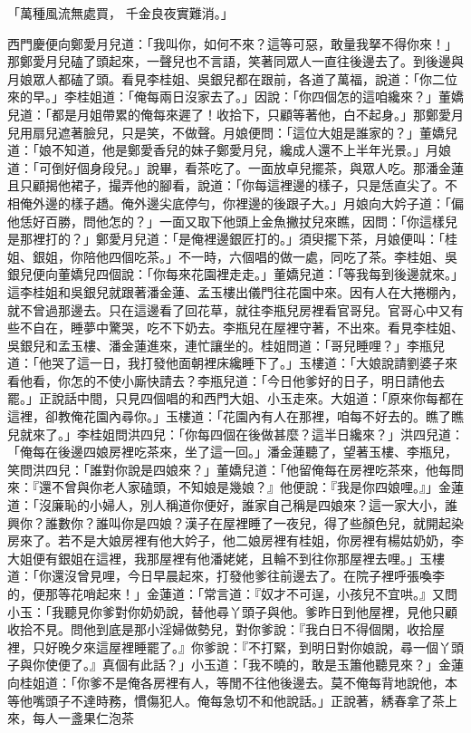 \begin{showcontents}{}
「萬種風流無處買，  千金良夜實難消。」

西門慶便向鄭愛月兒道：「我叫你，如何不來？這等可惡，敢量我拏不得你來！」那鄭愛月兒磕了頭起來，一聲兒也不言語，笑著同眾人一直往後邊去了。到後邊與月娘眾人都磕了頭。看見李桂姐、吳銀兒都在跟前，各道了萬福，說道：「你二位來的早。」李桂姐道：「俺每兩日沒家去了。」因說：「你四個怎的這咱纔來？」董嬌兒道：「都是月姐帶累的俺每來遲了！收拾下，只顧等著他，白不起身。」那鄭愛月兒用扇兒遮著臉兒，只是笑，不做聲。月娘便問：「這位大姐是誰家的？」董嬌兒道：「娘不知道，他是鄭愛香兒的妹子鄭愛月兒，纔成人還不上半年光景。」月娘道：「可倒好個身段兒。」說畢，看茶吃了。一面放卓兒擺茶，與眾人吃。那潘金蓮且只顧揭他裙子，撮弄他的腳看，說道：「你每這裡邊的樣子，只是恁直尖了。不相俺外邊的樣子趫。俺外邊尖底停勻，你裡邊的後跟子大。」月娘向大妗子道：「偏他恁好百勝，問他怎的？」一面又取下他頭上金魚撇扙兒來瞧，因問：「你這樣兒是那裡打的？」鄭愛月兒道：「是俺裡邊銀匠打的。」須臾擺下茶，月娘便叫：「桂姐、銀姐，你陪他四個吃茶。」不一時，六個唱的做一處，同吃了茶。李桂姐、吳銀兒便向董嬌兒四個說：「你每來花園裡走走。」董嬌兒道：「等我每到後邊就來。」這李桂姐和吳銀兒就跟著潘金蓮、孟玉樓出儀門往花園中來。因有人在大捲棚內，就不曾過那邊去。只在這邊看了回花草，就往李瓶兒房裡看官哥兒。官哥心中又有些不自在，睡夢中驚哭，吃不下奶去。李瓶兒在屋裡守著，不出來。看見李桂姐、吳銀兒和孟玉樓、潘金蓮進來，連忙讓坐的。桂姐問道：「哥兒睡哩？」李瓶兒道：「他哭了這一日，我打發他面朝裡床纔睡下了。」玉樓道：「大娘說請劉婆子來看他看，你怎的不使小廝快請去？李瓶兒道：「今日他爹好的日子，明日請他去罷。」正說話中間，只見四個唱的和西門大姐、小玉走來。大姐道：「原來你每都在這裡，卻教俺花園內尋你。」玉樓道：「花園內有人在那裡，咱每不好去的。瞧了瞧兒就來了。」李桂姐問洪四兒：「你每四個在後做甚麼？這半日纔來？」洪四兒道：「俺每在後邊四娘房裡吃茶來，坐了這一回。」潘金蓮聽了，望著玉樓、李瓶兒，笑問洪四兒：「誰對你說是四娘來？」董嬌兒道：「他留俺每在房裡吃茶來，他每問來：『還不曾與你老人家磕頭，不知娘是幾娘？』他便說：『我是你四娘哩。』」金蓮道：「沒廉恥的小婦人，別人稱道你便好，誰家自己稱是四娘來？這一家大小，誰興你？誰數你？誰叫你是四娘？漢子在屋裡睡了一夜兒，得了些顏色兒，就開起染房來了。若不是大娘房裡有他大妗子，他二娘房裡有桂姐，你房裡有楊姑奶奶，李大姐便有銀姐在這裡，我那屋裡有他潘姥姥，且輪不到往你那屋裡去哩。」玉樓道：「你還沒曾見哩，今日早晨起來，打發他爹往前邊去了。在院子裡呼張喚李的，便那等花哨起來！」金蓮道：「常言道：『奴才不可逞，小孩兒不宜哄。』又問小玉：「我聽見你爹對你奶奶說，替他尋丫頭子與他。爹昨日到他屋裡，見他只顧收拾不見。問他到底是那小淫婦做勢兒，對你爹說：『我白日不得個閑，收拾屋裡，只好晚夕來這屋裡睡罷了。』你爹說：『不打緊，到明日對你娘說，尋一個丫頭子與你使便了。』真個有此話？」小玉道：「我不曉的，敢是玉簫他聽見來？」金蓮向桂姐道：「你爹不是俺各房裡有人，等閒不往他後邊去。莫不俺每背地說他，本等他嘴頭子不達時務，慣傷犯人。俺每急切不和他說話。」正說著，綉春拿了茶上來，每人一盞果仁泡茶 
\end{showcontents}
